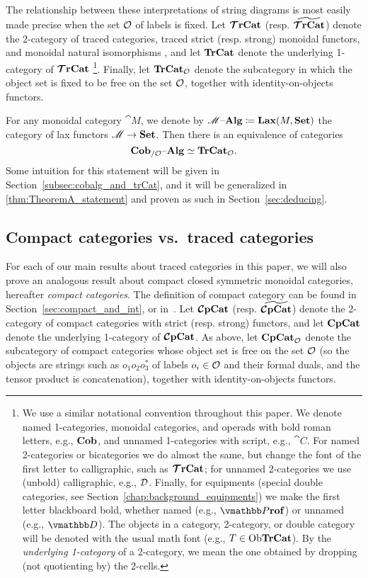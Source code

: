 \documentclass[11pt,oneside,article]{memoir}
\begin{document}
The relationship between these interpretations of string diagrams is most easily made precise when
the set $\mathcal{O}$ of labels is fixed. Let $\bm{\mathcal{T}}\mathbf{rCat}$ (resp. $\widetilde{\bm{\mathcal{T}}\mathbf{rCat}}$) denote the 2-category of traced categories,
traced strict (resp. strong) monoidal functors, and monoidal natural isomorphisms \cite{HK}, and let $\mathbf{TrCat}$
denote the underlying 1-category of $\bm{\mathcal{T}}\mathbf{rCat}$ %
\footnote{
   We use a similar notational convention throughout this paper. We denote named 1-categories,
   monoidal categories, and operads with bold roman letters, e.g., $\mathbf{Cob}$, and unnamed
   1-categories with script, e.g., $\cat{C}$. For named 2-categories or bicategories we do almost
   the same, but change the font of the first letter to calligraphic, such as $\bm{\mathcal{T}}\mathbf{rCat}$; for
   unnamed 2-categories we use (unbold) calligraphic, e.g., $\mathcal{D}$.  Finally, for equipments
   (special double categories, see Section~\ref{chap:background_equipments}) we make the first letter
   blackboard bold, whether named (e.g., $\ndcat{P}{rof}$) or unnamed (e.g., $\dcat{D}$). The
   objects in a category, 2-category, or double category will be denoted with the usual math font
   (e.g., $T\in\mathrm{Ob}\mathbf{TrCat}$). By the \emph{underlying 1-category} of a 2-category, we mean the one obtained by dropping (not quotienting by) the 2-cells.}.
Finally, let $\mathbf{TrCat}_{\mathcal{O}}$ denote the subcategory in which the object set is fixed to be free
on the set $\mathcal{O}$, together with identity-on-objects functors. 

For any monoidal category $\cat{M}$, we denote by $\mathscr{M}{\text \textendash}\mathbf{Alg}\coloneqq\mathbf{Lax}(M,\mathbf{Set})$ the category of lax
functors $\mathscr{M}\to\mathbf{Set}$. Then there is an equivalence of categories
\begin{equation}\label{eq:single_fiber_tr}
   \mathbf{Cob}_{/\mathcal{O}}{\text \textendash}\mathbf{Alg}\simeq\mathbf{TrCat}_{\mathcal{O}}.
\end{equation}
Some intuition for this statement will be given in Section~\ref{subsec:cobalg_and_trCat}, and it
will be generalized in \ref{thm:TheoremA_statement} and proven as such in Section~\ref{sec:deducing}.

\subsection{Compact categories vs.\ traced categories}

For each of our main results about traced categories in this paper, we will also prove an analogous
result about compact closed symmetric monoidal categories, hereafter \emph{compact categories}. The
definition of compact category can be found in Section~\ref{sec:compact_and_int}, or
in~\cite{MacL--CTWM}. Let $\bm{\mathcal{C}}\mathbf{pCat}$ (resp. $\widetilde{\bm{\mathcal{C}}\mathbf{pCat}}$) denote the 2-category of compact categories with strict (resp. strong) functors, and let $\mathbf{CpCat}$
denote the underlying 1-category of $\bm{\mathcal{C}}\mathbf{pCat}$. As above, let $\mathbf{CpCat}_{\mathcal{O}}$ denote the subcategory of
compact categories whose object set is free on the set $\mathcal{O}$ (so the objects are strings such as
$o_1o_2o_3^*$ of labels $o_i\in\mathcal{O}$ and their formal duals, and the tensor product is
concatenation), together with identity-on-objects functors. 
\end{document}
